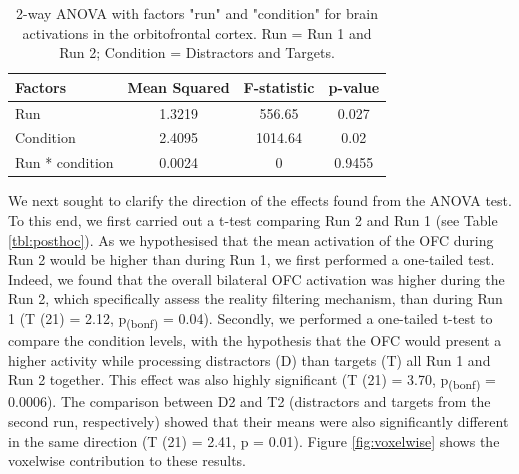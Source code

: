 \begin{table}
\vspace{20px}
\begin{center}
\begin{tabular}{ ||l||c c c|| } 

  \hline
\rowcolor{BabyBlue}
Factors & Mean Squared & F-statistic & p-value\\
  \hline
  \hline
Run   & 1.3219 & 556.65 & 0.027 \\ 
  \hline
Condition  & 2.4095   & 1014.64 & 0.02 \\ 
  \hline
Run * condition  & 0.0024 & 0 & 0.9455 \\ 

 \hline
\end{tabular}

\end{center}
\caption{2-way ANOVA with factors "run" and "condition" for brain activations in the orbitofrontal cortex. Run = Run 1 and Run 2; Condition = Distractors and Targets. } \label{tbl:anova}
\end{table}


We next sought to clarify the direction of the effects found from the ANOVA test. To this end, we first carried out a t-test comparing Run 2 and Run 1 (see Table \ref{tbl:posthoc}). As we hypothesised that the mean activation of the OFC during Run 2 would be higher than during Run 1, we first performed a one-tailed test. Indeed, we found that the overall bilateral OFC activation was higher during the Run 2, which specifically assess the reality filtering mechanism, than during Run 1 (T (21) = 2.12, p\textsubscript{(bonf)} = 0.04). Secondly, we performed a one-tailed t-test to compare the condition levels, with the hypothesis that the OFC would present a higher activity while processing distractors (D) than targets (T) all Run 1 and Run 2 together. This effect was also highly significant (T (21) = 3.70, p\textsubscript{(bonf)} = 0.0006). The comparison between D2 and T2 (distractors and targets from the second run, respectively) showed that their means were also significantly different in the same direction (T (21) = 2.41, p = 0.01). Figure \ref{fig:voxelwise} shows the voxelwise contribution to these results. 



